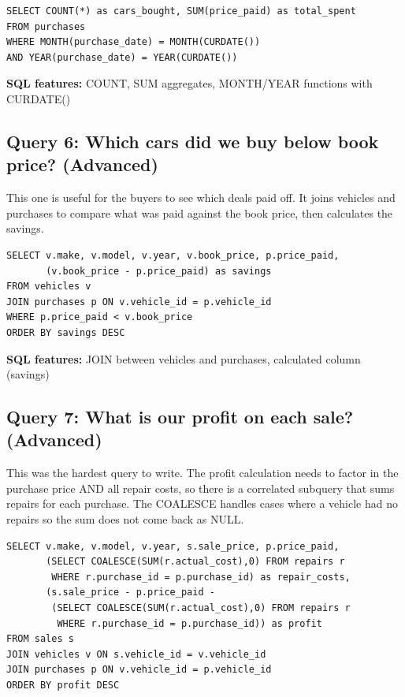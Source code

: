 \documentclass[12pt]{article}
\begin{document}
\begin{lstlisting}[style=sql]
SELECT COUNT(*) as cars_bought, SUM(price_paid) as total_spent
FROM purchases
WHERE MONTH(purchase_date) = MONTH(CURDATE())
AND YEAR(purchase_date) = YEAR(CURDATE())
\end{lstlisting}

\textbf{SQL features:} COUNT, SUM aggregates, MONTH/YEAR functions with CURDATE()

\subsection{Query 6: Which cars did we buy below book price? (Advanced)}

This one is useful for the buyers to see which deals paid off. It joins vehicles and purchases to compare what was paid against the book price, then calculates the savings.

\begin{lstlisting}[style=sql]
SELECT v.make, v.model, v.year, v.book_price, p.price_paid,
       (v.book_price - p.price_paid) as savings
FROM vehicles v
JOIN purchases p ON v.vehicle_id = p.vehicle_id
WHERE p.price_paid < v.book_price
ORDER BY savings DESC
\end{lstlisting}

\textbf{SQL features:} JOIN between vehicles and purchases, calculated column (savings)

\subsection{Query 7: What is our profit on each sale? (Advanced)}

This was the hardest query to write. The profit calculation needs to factor in the purchase price AND all repair costs, so there is a correlated subquery that sums repairs for each purchase. The COALESCE handles cases where a vehicle had no repairs so the sum does not come back as NULL.

\begin{lstlisting}[style=sql]
SELECT v.make, v.model, v.year, s.sale_price, p.price_paid,
       (SELECT COALESCE(SUM(r.actual_cost),0) FROM repairs r
        WHERE r.purchase_id = p.purchase_id) as repair_costs,
       (s.sale_price - p.price_paid -
        (SELECT COALESCE(SUM(r.actual_cost),0) FROM repairs r
         WHERE r.purchase_id = p.purchase_id)) as profit
FROM sales s
JOIN vehicles v ON s.vehicle_id = v.vehicle_id
JOIN purchases p ON v.vehicle_id = p.vehicle_id
ORDER BY profit DESC
\end{lstlisting}
\end{document}
